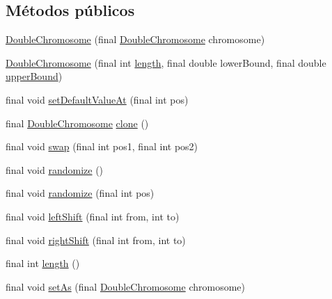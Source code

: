 \subsection*{Métodos públicos}
\begin{DoxyCompactItemize}
\item 
\hyperlink{classjenes_1_1chromosome_1_1_double_chromosome_a849079d41a2f10db681ba24de10d2619}{Double\-Chromosome} (final \hyperlink{classjenes_1_1chromosome_1_1_double_chromosome}{Double\-Chromosome} chromosome)
\item 
\hyperlink{classjenes_1_1chromosome_1_1_double_chromosome_a7166da8f71e5b0cf37e751c053f6ff5f}{Double\-Chromosome} (final int \hyperlink{classjenes_1_1chromosome_1_1_double_chromosome_a0938c891dcd64d56dcbfbc9136438b92}{length}, final double lower\-Bound, final double \hyperlink{classjenes_1_1chromosome_1_1_double_chromosome_a56362107033b220e75d83b75ea91b74e}{upper\-Bound})
\item 
final void \hyperlink{classjenes_1_1chromosome_1_1_double_chromosome_a82130d84dadedda332121b92f801d2e6}{set\-Default\-Value\-At} (final int pos)
\item 
final \hyperlink{classjenes_1_1chromosome_1_1_double_chromosome}{Double\-Chromosome} \hyperlink{classjenes_1_1chromosome_1_1_double_chromosome_ac471f6b6cb7989e6b90c5e70e7b8a9a2}{clone} ()
\item 
final void \hyperlink{classjenes_1_1chromosome_1_1_double_chromosome_ac34343c04259b0e3da8a7b2579cbd5fc}{swap} (final int pos1, final int pos2)
\item 
final void \hyperlink{classjenes_1_1chromosome_1_1_double_chromosome_a1ecf9f1d70333b8cbabdba918946cdfc}{randomize} ()
\item 
final void \hyperlink{classjenes_1_1chromosome_1_1_double_chromosome_a370f8d51fa8635eeadf925e2faf11991}{randomize} (final int pos)
\item 
final void \hyperlink{classjenes_1_1chromosome_1_1_double_chromosome_a8d8eb8ce2b20abad8d462ae87a213e85}{left\-Shift} (final int from, int to)
\item 
final void \hyperlink{classjenes_1_1chromosome_1_1_double_chromosome_ae2c6d9bac13241a8338623c612d0f70b}{right\-Shift} (final int from, int to)
\item 
final int \hyperlink{classjenes_1_1chromosome_1_1_double_chromosome_a0938c891dcd64d56dcbfbc9136438b92}{length} ()
\item 
final void \hyperlink{classjenes_1_1chromosome_1_1_double_chromosome_a7479d1ee74934b04f478dcf8fad35464}{set\-As} (final \hyperlink{classjenes_1_1chromosome_1_1_double_chromosome}{Double\-Chromosome} chromosome)

\end{DoxyCompactItemize}
